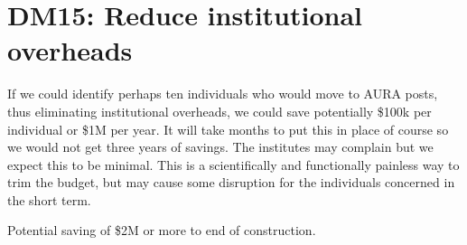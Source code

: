 \section{DM15: Reduce institutional overheads}\label{sect:dm15}

If we could identify perhaps ten individuals who would move to AURA posts, thus eliminating institutional overheads,
we could save potentially \$100k per individual or \$1M per year.
It will take months to put this in place of course so we would not get three years of savings.
The institutes may complain but we expect this to be minimal.
This is a scientifically and functionally painless way to trim the budget, but may cause some disruption for the individuals concerned in the short term.

Potential saving of \$2M  or more to end of construction.



